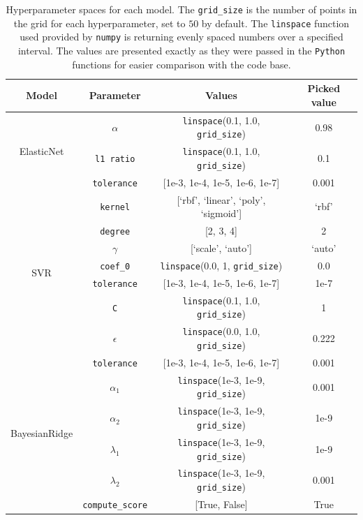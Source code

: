 \documentclass[12pt]{article}
\begin{document}
\begin{table}[H]
    \centering
    \begin{tabular}{|c|c|c|c|}
        \hline
        \textbf{Model} & \textbf{Parameter} & \textbf{Values} & \textbf{Picked value} \\
        \hline
        \multirow{3}{*}{ElasticNet} 
            & \texttt{$\alpha$} & \texttt{linspace}(0.1, 1.0, \texttt{grid\_size}) & 0.98 \\
            & \texttt{l1 ratio} & \texttt{linspace}(0.1, 1.0, \texttt{grid\_size}) & 0.1 \\
            & \texttt{tolerance} & [1e-3, 1e-4, 1e-5, 1e-6, 1e-7] & 0.001 \\
        \hline
        \multirow{7}{*}{SVR} 
            & \texttt{kernel} & [`rbf', `linear', `poly', `sigmoid'] & `rbf' \\
            & \texttt{degree} & [2, 3, 4] & 2 \\
            & \texttt{$\gamma$} & [`scale', `auto'] & `auto' \\
            & \texttt{coef\_0} & \texttt{linspace}(0.0, 1, \texttt{grid\_size}) & 0.0 \\
            & \texttt{tolerance} & [1e-3, 1e-4, 1e-5, 1e-6, 1e-7] & 1e-7 \\
            & \texttt{C} & \texttt{linspace}(0.1, 1.0, \texttt{grid\_size}) & 1 \\
            & \texttt{$\epsilon$} & \texttt{linspace}(0.0, 1.0, \texttt{grid\_size}) & 0.222 \\
        \hline
        \multirow{6}{*}{BayesianRidge} 
            & \texttt{tolerance} & [1e-3, 1e-4, 1e-5, 1e-6, 1e-7] & 0.001 \\
            & \texttt{$\alpha_1$} & \texttt{linspace}(1e-3, 1e-9, \texttt{grid\_size}) & 0.001 \\
            & \texttt{$\alpha_2$} & \texttt{linspace}(1e-3, 1e-9, \texttt{grid\_size}) & 1e-9 \\
            & \texttt{$\lambda_1$} & \texttt{linspace}(1e-3, 1e-9, \texttt{grid\_size}) & 1e-9 \\
            & \texttt{$\lambda_2$} & \texttt{linspace}(1e-3, 1e-9, \texttt{grid\_size}) & 0.001 \\
            & \texttt{compute\_score} & [True, False] & True \\
        \hline
    \end{tabular}
    \caption{Hyperparameter spaces for each model. The \texttt{grid\_size} is the
    number of points in the grid for each hyperparameter, set to $50$ by default.
    The \texttt{linspace} function used provided by \texttt{numpy} is returning
    evenly spaced numbers over a specified interval. The values are presented exactly
    as they were passed in the \texttt{Python} functions for easier comparison
    with the code base.}
    \label{tab:hyperparams}
\end{table}
\end{document}
